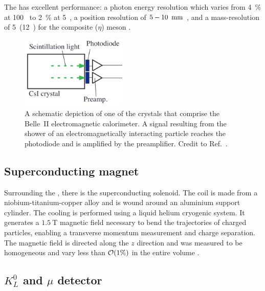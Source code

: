 The \ECL has excellent performance: a photon energy resolution which varies from 4~\% at 100~\mev \cite{Miyabayashi:2020xzp} to 2~\% at 5~\gev \cite{Aulchenko:2015nvy},
a position resolution of $5-10~{\rm \,mm}$ \cite{Miyabayashi:2020xzp}, and a mass-resolution of 5~\mevcc(12~\mevcc) for the composite \piz ($\eta$) meson \cite{Miyabayashi:2020xzp}.

\begin{figure}[hbtp!]
    \centering
    \includegraphics[width=0.45\textwidth]{figures/experimental_setup/ecl.png}
    \caption{\label{fig:ecl}
    A schematic depiction of one of the crystals that comprise the Belle~II electromagnetic calorimeter.
    A signal resulting from the shower of an electromagnetically interacting particle reaches the photodiode and is amplified by the preamplifier.
    Credit to Ref.~\cite{Miyabayashi:2020xzp}.
    }
\end{figure}

\subsection{Superconducting magnet}\label{sec:magnet}

Surrounding the \ECL \cite{Belle-II:2010dht}, there is the superconducting solenoid.
The coil is made from a niobium-titanium-copper alloy and is wound around an aluminium support cylinder.
The cooling is performed using a liquid helium cryogenic system.
It generates a $1.5~\mathrm{T}$ magnetic field necessary 
to bend the trajectories of charged particles, 
enabling a transverse momentum measurement and charge separation.
The magnetic field is directed along the $z$ direction 
and was measured to be homogeneous and vary less than ${\cal O}(1\%)$ in the entire volume \cite{BelleIITrackingGroup:2020hpx}.

\subsection{\texorpdfstring{$K_L^0$}{KL} and \texorpdfstring{$\mu$}{mu} detector}\label{sec:klm}

